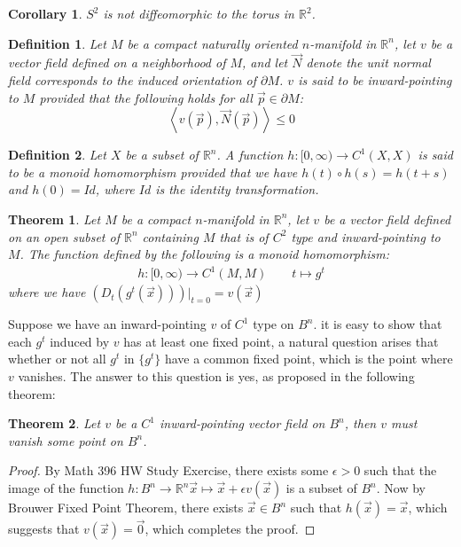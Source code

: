 \documentclass[15pt]{book}
\theoremstyle{break}
\theoremstyle{break}
\newtheorem{thm}{Theorem}[section]
\newtheorem{corT}[lem]{Corollary}
\newtheorem{defn}{Definition}[corL]
\newcommand{\R}{\mathbb{R}}
\begin{document}
\begin{corT}
$S^2$ is not diffeomorphic to the torus in $\R^2$. 
\end{corT}


\begin{defn}
Let $M$ be a compact naturally oriented $n$-manifold in $\R^n$, let $v$ be a vector field defined on a neighborhood of $M$, and let $\vec{N}$ denote  the unit normal field corresponds to the induced orientation of $\partial M$. $v$ is said to be inward-pointing to $M$ provided that the following holds for all $\vec{p}\in \partial M$: $$\left<v(\vec{p}), \vec{N}(\vec{p})\right> \leq 0$$
\end{defn}

\begin{defn}
Let $X$ be a subset of $\R^n$. A function $h:[0,\infty)\to C^1(X,X)$ is said to be a monoid homomorphism provided that we have $h(t) \circ h(s) = h(t+s)$ and $h(0) = Id$, where $Id$ is the identity transformation.
\end{defn}

\begin{thm}
Let $M$ be a compact $n$-manifold in $\R^n$, let $v$ be a vector field defined on an open subset of $\R^n$ containing $M$ that is of $C^2$ type and inward-pointing to $M$. The function defined by the following is a monoid homomorphism:
\begin{align*}
h: [0,\infty) \to C^1(M,M) \qquad t\mapsto g^t
\end{align*}
where we have $\left(D_t(g^t(\vec{x}))\right)|_{t=0} = v(\vec{x})$
\end{thm}

\newpage
Suppose we have an inward-pointing $v$ of $C^1$ type on $B^n$. it is easy to show that each $g^t$ induced by $v$ has at least one fixed point, a natural question arises that whether or not all $g^t$ in $\{g^t\}$ have a common fixed point, which is the point where $v$ vanishes. The answer to this question is yes, as proposed in the following theorem:

\begin{thm}
Let $v$ be a $C^1$ inward-pointing vector field on $B^n$, then $v$ must vanish some point on $B^n$.
\end{thm}
\begin{proof}
By Math 396 HW Study Exercise, there exists some $\epsilon>0$ such that the image of the function $h:B^n \to \R^n \vec{x}\mapsto \vec{x}+\epsilon v(\vec{x})$ is a subset of $B^n$. Now by Brouwer Fixed Point Theorem, there exists $\vec{x} \in B^n$ such that $h(\vec{x})  =\vec{x}$, which suggests that $v(\vec{x}) = \vec{0}$, which completes the proof.
\end{proof}
\end{document}
